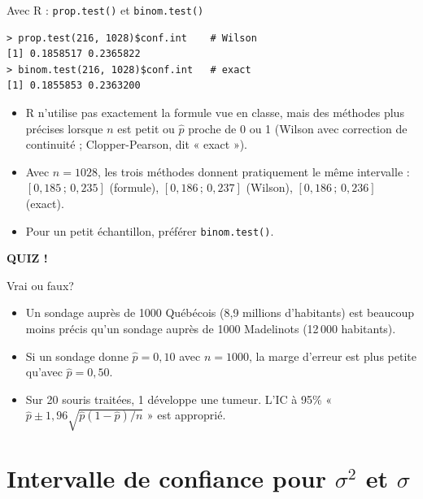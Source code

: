 \documentclass{BeamerTemplate}
\begin{document}
\begin{frame}[fragile,t]{Avec R : \texttt{prop.test()} et \texttt{binom.test()}}
  \small
\begin{verbatim}
> prop.test(216, 1028)$conf.int    # Wilson
[1] 0.1858517 0.2365822
> binom.test(216, 1028)$conf.int   # exact
[1] 0.1855853 0.2363200
\end{verbatim}

  \normalsize
  \begin{itemize}\itemsep 2mm
    \item R n'utilise pas exactement la formule vue en classe, mais des méthodes plus précises lorsque $n$ est petit ou $\hat{p}$ proche de 0 ou 1 (Wilson avec correction de continuité ; Clopper-Pearson, dit « exact »).
    \item Avec $n = 1028$, les trois méthodes donnent pratiquement le même intervalle : $[0{,}185 \,;\, 0{,}235]$ (formule), $[0{,}186 \,;\, 0{,}237]$ (Wilson), $[0{,}186 \,;\, 0{,}236]$ (exact).
    \item Pour un petit échantillon, préférer \texttt{binom.test()}.
  \end{itemize}
\end{frame}

\begin{frame}[plain,t]
  \centerline{\LARGE\bfseries\alert{QUIZ !}}

  \medskip
  Vrai ou faux?
  \begin{itemize}\itemsep 1.1cm
    \item Un sondage auprès de 1000 Québécois (8,9 millions d'habitants) est beaucoup moins précis qu'un sondage auprès de 1000 Madelinots (12\,000 habitants).
    \item<2-> Si un sondage donne $\hat{p} = 0{,}10$ avec $n = 1000$, la marge d'erreur est plus petite qu'avec $\hat{p} = 0{,}50$.
    \item<3-> Sur 20 souris traitées, 1 développe une tumeur. L'IC à 95\% « $\hat{p} \pm 1{,}96\sqrt{\hat{p}(1-\hat{p})/n}$ » est approprié.
  \end{itemize}
\end{frame}

\section{Intervalle de confiance pour \texorpdfstring{$\sigma^2$}{sigma2} et \texorpdfstring{$\sigma$}{sigma}}
\end{document}
